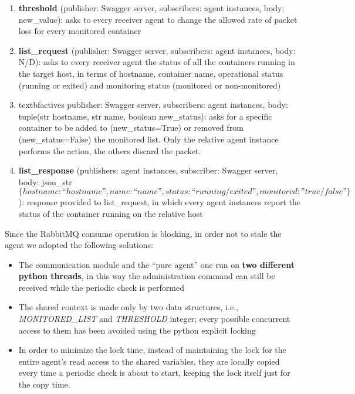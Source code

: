 \begin{enumerate}
	\item \textbf{threshold} (publisher: Swagger server, subscribers: agent instances, body: new\_value): asks to every receiver agent to change the allowed rate of packet loss for every monitored container
	\item \textbf{list\_request} (publisher: Swagger server, subscribers: agent instances, body: N/D): asks to every receiver agent the status of all the containers running in the target host, in terms of hostname, container name, operational status (running or exited) and monitoring status (monitored or non-monitored)
	\item textbf{actives} publisher: Swagger server, subscribers: agent instances, body: tuple(str hostname, str name, boolean new\_status): asks for a specific container to be added to (new\_status=True) or removed from (new\_status=False) the monitored list. Only the relative agent instance performs the action, the others discard the packet.
	\item \textbf{list\_response} (publishers: agent instances, subscriber: Swagger server, body: json\_str \textit{\[\{hostname: “hostname”, name: “name”, status: “running/exited”, monitored: ”true/false”\}\]}): response provided to list\_request, in which every agent instances report the status of the container running on the relative host
\end{enumerate}

\noindent Since the RabbitMQ consume operation is blocking, in order not to stale the agent we adopted the following solutions:
\begin{itemize}
	\item The communication module and the “pure agent” one run on \textbf{two different python threads}, in this way the administration command can still be received while the periodic check is performed
	\item The shared context is made only by two data structures, i.e.,  \textit{MONITORED\_LIST} and \textit{THRESHOLD} integer; every possible concurrent access to them has been avoided using the python explicit locking
	\item In order to minimize the lock time, instead of maintaining the lock for the entire agent’s read access to the shared variables, they are locally copied every time a periodic check is about to start, keeping the lock itself just for the copy time.
\end{itemize}


